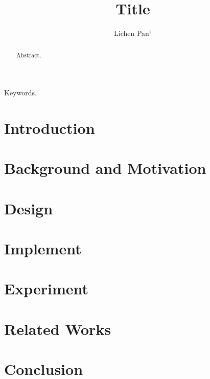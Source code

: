 \documentclass[conference]{IEEEtran}
\begin{document}
\title{Title}


\author{Lichen Pan$^\dagger$}

\maketitle

\begin{abstract}
	Abstract.
\end{abstract}

\begin{IEEEkeywords}
	Keywords.
\end{IEEEkeywords}

\section{Introduction}
\label{sec:introduction}


\section{Background and Motivation}
\label{sec:background}


\section{Design}
\label{sec:design}


\section{Implement}
\label{sec:implement}


\section{Experiment}
\label{sec:experiment}


\section{Related Works}
\label{sec:related}


\section{Conclusion}
\label{sec:conclusion}



\end{document}
